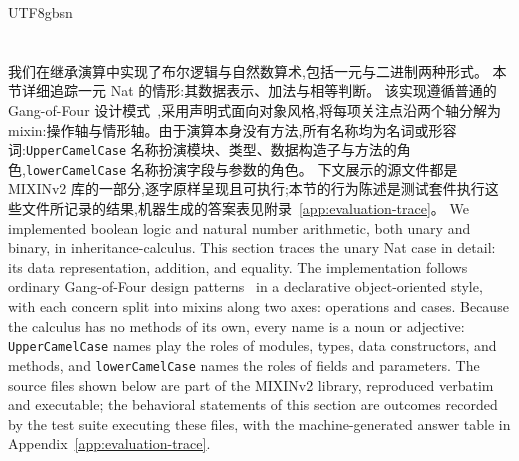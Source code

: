 \begin{CJK*}{UTF8}{gbsn}
\section{}
\label{sec:case-study}

\ifPaperChinese
我们在继承演算中实现了布尔逻辑与自然数算术,包括一元与二进制两种形式。
本节详细追踪一元 Nat 的情形:其数据表示、加法与相等判断。
该实现遵循普通的 Gang-of-Four 设计模式~\cite{gamma1994-design-patterns},采用声明式面向对象风格,将每项关注点沿两个轴分解为 mixin:操作轴与情形轴。由于演算本身没有方法,所有名称均为名词或形容词:\texttt{UpperCamelCase} 名称扮演模块、类型、数据构造子与方法的角色,\texttt{lowerCamelCase} 名称扮演字段与参数的角色。
下文展示的源文件都是 MIXINv2 库的一部分,逐字原样呈现且可执行;本节的行为陈述是测试套件执行这些文件所记录的结果,机器生成的答案表见附录~\ref{app:evaluation-trace}。
\else
We implemented boolean logic and natural number arithmetic, both unary
and binary, in inheritance-calculus.
This section traces the unary Nat case in detail: its data representation,
addition, and equality.
The implementation follows ordinary Gang-of-Four design
patterns~\cite{gamma1994-design-patterns} in a declarative object-oriented
style, with each concern split into mixins along two axes: operations and
cases. Because the calculus has no methods of its own, every name is a noun or
adjective: \texttt{UpperCamelCase} names play the roles of modules, types, data
constructors, and methods, and \texttt{lowerCamelCase} names the roles of fields and
parameters.
The source files shown below are part of the MIXINv2
library, reproduced verbatim and
executable; the behavioral statements of this section are outcomes
recorded by the test suite executing these files, with the
machine-generated answer table in
Appendix~\ref{app:evaluation-trace}.
\fi


\end{CJK*}
